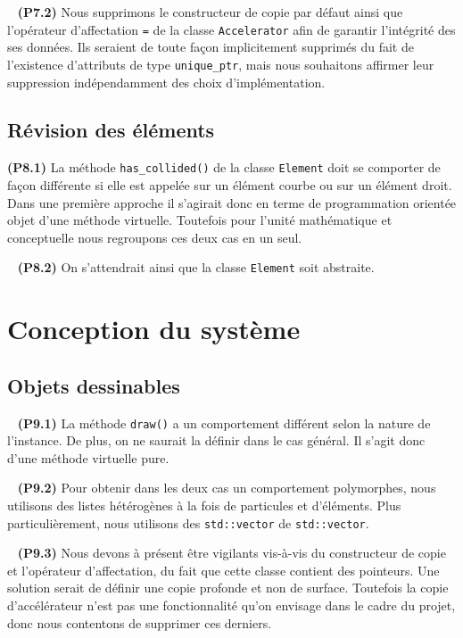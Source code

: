 \documentclass[12pt, letterpaper, twoside]{article}
\newcommand{\T}[1]{\texttt{#1}}
\begin{document}
\ \linebreak
\noindent \textbf{(P7.2)} Nous supprimons le constructeur de copie par défaut ainsi que l'opérateur d'affectation \T{=} de la classe \T{Accelerator} afin de garantir l'intégrité des ses données. Ils seraient de toute façon implicitement supprimés du fait de l'existence d'attributs de type \T{unique\_ptr}, mais nous souhaitons affirmer leur suppression indépendamment des choix d'implémentation.

\subsection{Révision des éléments}

\noindent \textbf{(P8.1)} La méthode \T{has\_collided()} de la classe \T{Element} doit se comporter de façon différente si elle est appelée sur un élément courbe ou sur un élément droit. Dans une première approche il s'agirait donc en terme de programmation orientée objet d'une méthode virtuelle. Toutefois pour l'unité mathématique et conceptuelle nous regroupons ces deux cas en un seul.

\ \linebreak
\noindent \textbf{(P8.2)} On s'attendrait ainsi que la classe \T{Element} soit abstraite.

\section{Conception du système}

\subsection{Objets dessinables}

\ \linebreak
\noindent \textbf{(P9.1)} La méthode \T{draw()} a un comportement différent selon la nature de l'instance. De plus, on ne saurait la définir dans le cas général. Il s'agit donc d'une méthode virtuelle pure.

\ \linebreak
\noindent \textbf{(P9.2)} Pour obtenir dans les deux cas un comportement polymorphes, nous utilisons des listes hétérogènes à la fois de particules et d'éléments. Plus particulièrement, nous utilisons des \T{std::vector} de \T{std::vector}.

\ \linebreak
\noindent \textbf{(P9.3)} Nous devons à présent être vigilants vis-à-vis du constructeur de copie et l'opérateur d'affectation, du fait que cette classe contient des pointeurs. Une solution serait de définir une copie profonde et non de surface. Toutefois la copie d'accélérateur n'est pas une fonctionnalité qu'on envisage dans le cadre du projet, donc nous contentons de supprimer ces derniers.
\end{document}
